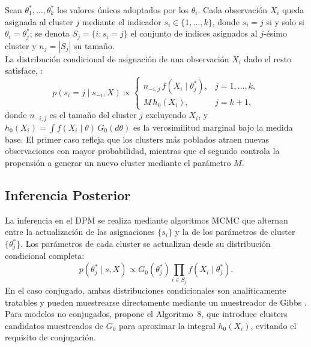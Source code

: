 Sean $\theta_1^*, \dots, \theta_k^*$ los valores únicos adoptados por los $\theta_i$. Cada observación $X_i$ queda asignada al cluster $j$ mediante el indicador $s_i \in \{1, \dots, k\}$, donde $s_i = j$ si y solo si $\theta_i = \theta_j^*$; se denota $S_j = \{i : s_i = j\}$ el conjunto de índices asignados al $j$-ésimo cluster y $n_j = |S_j|$ su tamaño.\\

La distribución condicional de asignación de una observación $X_i$ dado el resto satisface, \cite{02_05_escobar1995bayesian}:
\begin{equation}
    p(s_i = j \mid s_{-i}, X) \propto
    \begin{cases}
        n_{-i,j}\, f(X_i \mid \theta_j^*), & j = 1, \dots, k, \\
        M\, h_0(X_i),                      & j = k + 1,
    \end{cases}
\end{equation}
donde $n_{-i,j}$ es el tamaño del cluster $j$ excluyendo $X_i$, y $h_0(X_i) = \int f(X_i \mid \theta)\, G_0(d\theta)$ es la verosimilitud marginal bajo la medida base. El primer caso refleja que los clusters más poblados atraen nuevas observaciones con mayor probabilidad, mientras que el segundo controla la propensión a generar un nuevo cluster mediante el parámetro $M$.
\subsection{Inferencia Posterior}
\label{02_05_03_inferencia}
La inferencia en el DPM se realiza mediante algoritmos MCMC que alternan entre la actualización de las asignaciones $\{s_i\}$ y la de los parámetros de cluster $\{\theta_j^*\}$. Los parámetros de cada cluster se actualizan desde su distribución condicional completa:
\begin{equation}
    p(\theta_j^* \mid s, X) \propto G_0(\theta_j^*)
    \prod_{i \in S_j} f(X_i \mid \theta_j^*).
\end{equation}
En el caso conjugado, ambas distribuciones condicionales son analíticamente tratables y pueden muestrearse directamente mediante un muestreador de Gibbs \cite{02_05_escobar1995bayesian}. Para modelos no conjugados, \cite{02_05_neal2000markov} propone el Algoritmo~8, que introduce clusters candidatos muestreados de $G_0$ para aproximar la integral $h_0(X_i)$, evitando el requisito de conjugación.

